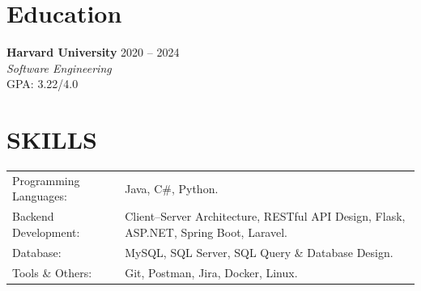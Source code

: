 \documentclass[10pt,a4paper]{article}
\begin{document}
\section*{Education}
\textbf{Harvard University} \hfill 2020 -- 2024 \\
\textit{Software Engineering} \\ 
{GPA: 3.22/4.0}


\section*{SKILLS}

\begin{tabular}{ @{}l p{12cm} }
Programming Languages: & Java, C\#, Python. \\
Backend Development: & Client--Server Architecture, RESTful API Design,
                            Flask, ASP.NET, Spring Boot, Laravel. \\
Database: & MySQL, SQL Server, SQL Query \& Database Design. \\
Tools \& Others: & Git, Postman, Jira, Docker, Linux. \\
\end{tabular}
\end{document}
